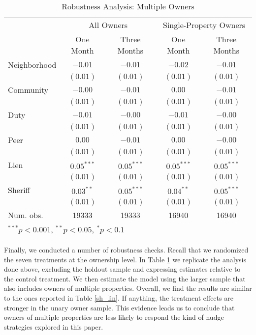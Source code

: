 \documentclass[12pt]{article}
\begin{document}
\begin{table}[htbp]
\caption{Robustness Analysis: Multiple Owners}\label{sh_lin_rob}
\begin{center}
\begin{tabular}{l c c c c }
\hline
 & \multicolumn{2}{c}{All Owners} & \multicolumn{2}{c}{Single-Property Owners} \\
          & One Month & Three Months & One Month & Three Months \\
\hline
Neighborhood & $-0.01$      & $-0.01$      & $-0.02$      & $-0.01$      \\
          & $(0.01)$     & $(0.01)$     & $(0.01)$     & $(0.01)$     \\
Community     & $-0.00$      & $-0.01$      & $0.00$       & $-0.01$      \\
          & $(0.01)$     & $(0.01)$     & $(0.01)$     & $(0.01)$     \\
Duty      & $-0.01$      & $-0.00$      & $-0.01$      & $-0.00$      \\
          & $(0.01)$     & $(0.01)$     & $(0.01)$     & $(0.01)$     \\
Peer      & $0.00$       & $-0.01$      & $0.00$       & $-0.00$      \\
          & $(0.01)$     & $(0.01)$     & $(0.01)$     & $(0.01)$     \\
Lien      & $0.05^{***}$ & $0.05^{***}$ & $0.05^{***}$ & $0.05^{***}$ \\
          & $(0.01)$     & $(0.01)$     & $(0.01)$     & $(0.01)$     \\
Sheriff   & $0.03^{**}$  & $0.05^{***}$ & $0.04^{**}$  & $0.05^{***}$ \\
          & $(0.01)$     & $(0.01)$     & $(0.01)$     & $(0.01)$     \\
\hline
Num. obs. & 19333        & 19333        & 16940        & 16940        \\
\hline
\multicolumn{5}{l}{\scriptsize{$^{***}p<0.001$, $^{**}p<0.05$, $^*p<0.1$}}
\end{tabular}
\end{center}
\end{table}


Finally, we conducted a number of robustness checks. Recall that we
randomized the seven treatments at the ownership level. In Table
\ref{sh_lin_rob} we replicate the analysis done above, excluding the
holdout sample and expressing estimates relative to the control
treatment. We then estimate the model using the larger sample that
also includes owners of multiple properties. Overall, we find the
results are similar to the ones reported in Table \ref{sh_lin}. If
anything, the treatment effects are stronger in the unary owner
sample. This evidence leads us to conclude that owners of multiple
properties are less likely to respond the kind of nudge strategies
explored in this paper.
\end{document}
